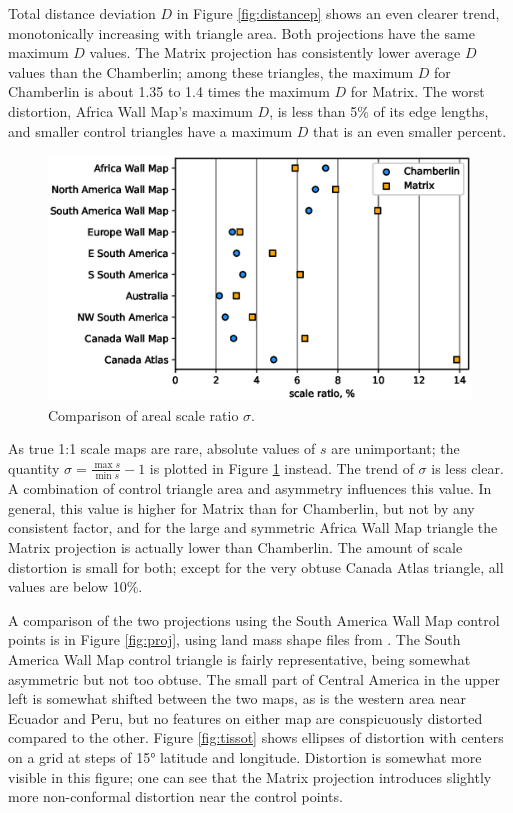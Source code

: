 \documentclass[]{interact}
\begin{document}
Total distance deviation $D$ in Figure \ref{fig:distancep} shows an even clearer
trend, monotonically increasing with triangle area. Both projections have the
same maximum $D$ values. The Matrix projection has consistently
lower average $D$ values than the Chamberlin; among these triangles,
the maximum $D$ for Chamberlin is about 1.35 to 1.4 times
the maximum $D$ for Matrix. The worst distortion,
Africa Wall Map's maximum $D$, is less than 5\% of its edge lengths, and
smaller control triangles have a maximum $D$ that is an even smaller percent.

\begin{figure}
  \includegraphics[width=\textwidth]{scaleplot}
  \caption{Comparison of areal scale ratio $\sigma$.}
  \label{fig:scalep}
\end{figure}

As true 1:1 scale maps are rare, absolute values of $s$ are unimportant; the
quantity $\sigma = \frac{\max s}{\min s} - 1$ is plotted in Figure
\ref{fig:scalep} instead. The trend of $\sigma$ is less clear. A combination of
control triangle area and asymmetry influences this value. In general, this
value is higher for Matrix than for Chamberlin, but not by any consistent
factor, and for the large and symmetric Africa Wall Map triangle the Matrix
projection is actually lower than Chamberlin.
The amount of scale distortion is small for both;
except for the very obtuse Canada Atlas triangle, all values are below 10\%.

A comparison of the two projections using the South America Wall Map control
points is in Figure \ref{fig:proj}, using land mass shape files from
\citet{natearth}. The South America Wall Map control triangle is fairly
representative, being somewhat asymmetric but not too obtuse. The small part of
Central America in the upper left is somewhat shifted between the two maps, as
is the western area near Ecuador and Peru, but no features on either map are
conspicuously distorted compared to the other. Figure \ref{fig:tissot} shows
ellipses of distortion with centers on a grid at steps of 15° latitude and
longitude. Distortion is somewhat more visible in this figure;
one can see that the Matrix projection
introduces slightly more non-conformal distortion near the control points.
\end{document}
